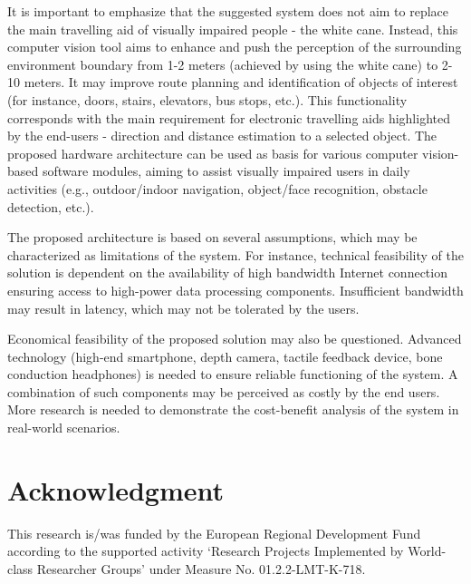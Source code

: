 \documentclass[10pt,conference,compsocconf]{IEEEtran}
\begin{document}
It is important to emphasize that the suggested system does not aim to replace the main travelling aid of visually impaired people - the white cane. Instead, this computer vision tool aims to enhance and push the perception of the surrounding environment boundary from 1-2 meters (achieved by using the white cane) to 2-10 meters. It may improve route planning and identification of objects of interest (for instance, doors, stairs, elevators, bus stops, etc.). This functionality corresponds with the main requirement for electronic travelling aids highlighted by the end-users - direction and distance estimation to a selected object. The proposed hardware architecture can be used as basis for various computer vision-based software modules, aiming to assist visually impaired users in daily activities (e.g., outdoor/indoor navigation, object/face recognition, obstacle detection, etc.). 


The proposed architecture is based on several assumptions, which may be characterized as limitations of the system. For instance, technical feasibility of the solution is dependent on the availability of high bandwidth Internet connection ensuring access to high-power data processing components. Insufficient bandwidth may result in latency, which may not be tolerated by the users.  

Economical feasibility of the proposed solution may also be questioned. Advanced technology (high-end smartphone, depth camera, tactile feedback device, bone conduction headphones) is needed to ensure reliable functioning of the system. A combination of such components may be perceived as costly by the end users. More research is needed to demonstrate the cost-benefit analysis of the system in real-world scenarios. 

\section*{Acknowledgment}
This research is/was funded by the European Regional Development Fund according to the supported activity ‘Research Projects Implemented by World-class Researcher Groups’ under Measure No. 01.2.2-LMT-K-718.





\end{document}
